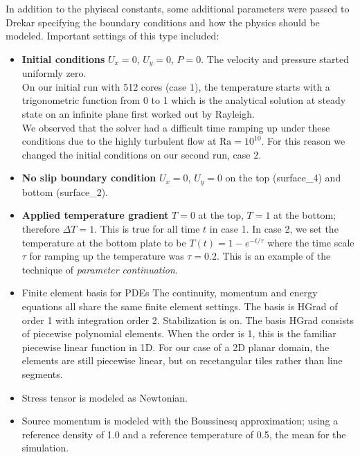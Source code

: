 \documentclass[11pt]{article} %
\begin{document}
In addition to the phyiscal constants, some additional parameters were passed to Drekar 
specifying the boundary conditions and how the physics should be modeled.
Important settings of this type included:
\begin{itemize}
\item{\textbf{Initial conditions}} $U_x = 0$, $U_y = 0$, $P = 0$.  The velocity and pressure started uniformly zero.\\
On our initial run with 512 cores (case 1), the temperature starts with a trigonometric function from 0 to 1
which is the analytical solution at steady state on an infinite plane first worked out by Rayleigh. \\
We observed that the solver had a difficult time ramping up under these conditions 
due to the highly turbulent flow at $\textrm{Ra} = 10^{10}$.  
For this reason we changed the initial conditions on our second run, case 2. 
\item{\textbf{No slip boundary condition}} $U_x = 0$, $U_y = 0$ 
on the top (surface\_4) and bottom (surface\_2).
\item{\textbf{Applied temperature gradient}} $T=0$ at the top, $T=1$ at the bottom; therefore $\Delta T = 1$.
This is true for all time $t$ in case 1.  
In case 2, we set the temperature at the bottom plate to be 
$T(t) = 1 - e^{-t / \tau}$ where the time scale $\tau$ for ramping up the temperature was $\tau = 0.2$.
This is an example of the technique of \textit{parameter continuation}.
\item{Finite element basis for PDEs} The continuity, momentum and energy equations all share the same
finite element settings.  The basis is HGrad of order 1 with integration order 2.  Stabilization is on.
The basis HGrad consists of piecewise polynomial elements.  
When the order is 1, this is the familiar piecewise linear function in 1D.
For our case of a 2D planar domain, the elements are still piecewise linear, 
but on recetangular tiles rather than line segments.
\item{Stress tensor} is modeled as Newtonian.
\item{Source momentum} is modeled with the Boussinesq approximation; 
using a reference density of 1.0 and a reference temperature of 0.5, the mean for the simulation.
\end{itemize}
\end{document}

